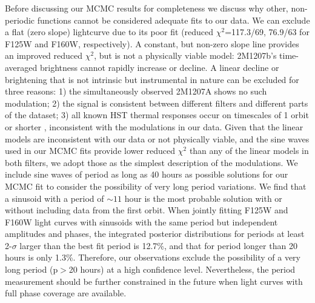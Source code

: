 \documentclass[apj]{emulateapj}
\newcommand{\reviseTwo}[1]{\textbf{{\color{cyan}{#1}}}}
\renewcommand{\reviseTwo}{}
\begin{document}
\reviseTwo{Before discussing our MCMC results for completeness we
  discuss why other, non-periodic functions cannot be considered
  adequate fits to our data. We can exclude a flat (zero slope)
  lightcurve due to its poor fit (reduced $\chi^{2}$=117.3/69,
  76.9/63 for F125W and F160W, respectively). A constant, but non-zero
  slope line provides an improved reduced $\chi^{2}$,
  but is not a physically viable model: 2M1207b's time-averaged
  brightness cannot rapidly increase or decline. A linear decline or
  brightening that is not intrinsic but instrumental in nature can be
  excluded for three reasons: 1) the simultaneously observed 2M1207A
  shows no such modulation; 2) the signal is consistent between
  different filters and different
  parts of the dataset; 3) all known HST thermal responses occur on
  timescales of 1 orbit or shorter \citep{Lallo2005}, inconsistent
  with the modulations in our data. Given that the linear models are
  inconsistent with our data or not physically viable, and the sine
  waves used in our MCMC fits provide lower reduced $\chi^{2}$ than any of
  the linear models in both filters, we adopt those as the simplest
  description of the modulations.  We include sine waves of period as
  long as 40 hours as possible solutions for our MCMC fit to consider
  the possibility of very long period variations. We find that a
  sinusoid with a period of $\sim 11$
  hour is the most probable solution with or without including data
  from the first orbit. When jointly fitting F125W and F160W light
  curves with sinusoids with the same period but independent amplitudes and
  phases, the integrated posterior distributions for periods at least 2-$\sigma$
  larger than the best fit period is 12.7\%, and that for period
  longer than 20 hours is only 1.3\%. Therefore, our observations exclude
  the possibility of a very long period (p$>$20 hours) at a high
  confidence level. Nevertheless, the period measurement should be further
  constrained in the future  when light curves with full phase
  coverage are available.}
\end{document}
